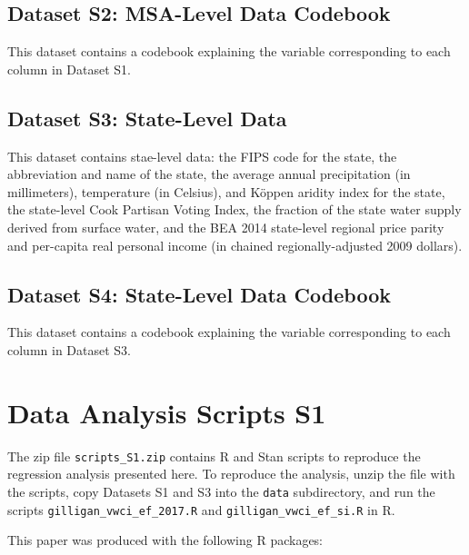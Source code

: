 \documentclass[draft]{agujournal}\usepackage{knitr}
\begin{document}
\subsection*{Dataset S2: MSA-Level Data Codebook}

This dataset contains a codebook explaining the variable corresponding to each column in Dataset S1.

\subsection*{Dataset S3: State-Level Data}

This dataset contains stae-level data: the FIPS code for the state, the abbreviation and name of the state,
the average annual precipitation (in millimeters), temperature (in Celsius), and K\"oppen aridity index for the state,
the state-level Cook Partisan Voting Index,
the fraction of the state water supply derived from surface water,
and the BEA 2014 state-level regional price parity and per-capita real personal income (in chained regionally-adjusted 2009 dollars).

\subsection*{Dataset S4: State-Level Data Codebook}

This dataset contains a codebook explaining the variable corresponding to each column in Dataset S3.

\section*{Data Analysis Scripts S1}

The zip file \verb+scripts_S1.zip+ contains R and Stan scripts to reproduce the
regression analysis presented here.
To reproduce the analysis, unzip the file with the scripts, copy Datasets S1
and S3 into the \verb+data+ subdirectory, and run the scripts
\verb+gilligan_vwci_ef_2017.R+ and \verb+gilligan_vwci_ef_si.R+ in R.

This paper was produced with the following R packages:
\end{document}

